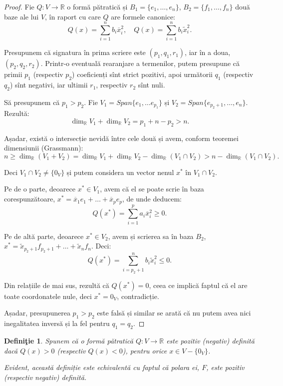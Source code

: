 \documentclass[11pt,a4paper]{article}
\theoremstyle{dotless}
\theoremstyle{dotlessdr}
\newtheorem{definition}{Defini\c{t}ie}[section]
\begin{document}
\begin{proof}
	Fie $Q : V \to \mathbb{R}$ o formă pătratică și $B_1 = \{e_1, \dots, e_n\}$,
$B_2 = \{f_1, \dots, f_n\}$ două baze ale lui $V$, în raport cu care $Q$ are
formele canonice: 
 \[
	Q(x) = \sum_{i=1}^n b_i \overline{x}_i^2, \quad 
	Q(x) = \sum_{i=1}^n b_i \widetilde{x}_i^2.
\]

Presupunem că signatura în prima scriere este $(p_1, q_1, r_1)$, iar în a doua,
$(p_2, q_2, r_2)$. Printr-o eventuală rearanjare a termenilor, putem presupune
că primii $p_1$ (respectiv $p_2$) coeficienți sînt strict pozitivi, apoi
următorii $q_1$ (respectiv $q_2$) sînt negativi, iar ultimii $r_1$, respectiv
$r_2$ sînt nuli.

Să presupunem că $p_1 > p_2$. Fie $V_1 = Span \{e_1, \dots e_{p_1}\}$ și
$V_2 = Span \{e_{p_2 + 1}, \dots, e_n\}$. Rezultă: 
 \[
	\dim_{\mathbb{R}} V_1 + \dim_{\mathbb{R}} V_2 = p_1 + n - p_2 > n.
\]

Așadar, există o intersecție nevidă între cele două și avem, conform teoremei
dimensiunii (Grassmann): 
 \[
	n \geq \dim_{\mathbb{R}}(V_1 + V_2) = \dim_{\mathbb{R}} V_1 + 
	\dim_{\mathbb{R}} V_2 - \dim_{\mathbb{R}} (V_1 \cap V_2) > 
	n - \dim_{\mathbb{R}} (V_1 \cap V_2).
\]

Deci $V_1 \cap V_2 \neq \{0_V\}$ și putem considera un vector nenul $x^\ast$ în
$V_1 \cap V_2$.

Pe de o parte, deoarece $x^\ast \in V_1$, avem că el se poate scrie în baza
corespunzătoare, $x^\ast = \overline{x}_1 e_1 + \dots + \overline{x}_p e_p$,
de unde deducem: 
 \[
	Q(x^\ast) = \sum_{i=1}^p a_i \overline{x}_i^2 \geq 0.
\]

Pe de altă parte, deoarece $x^\ast \in V_2$, avem și scrierea sa în baza
$B_2$, $x^\ast = \widetilde{x}_{p_2 + 1} f_{p_2 + 1} + \dots + 
                 \widetilde{x}_n f_n$. Deci: 
 \[
	Q(x^\ast) = \sum_{i = p_2 + 1}^n b_i \widetilde{x}_i^2 \leq 0.
\]

Din relațiile de mai sus, rezultă că $Q(x^\ast) = 0$, ceea ce implică faptul
că el are toate coordonatele nule, deci $x^\ast = 0_V$, contradicție.

Așadar, presupunerea $p_1 > p_2$ este falsă și similar se arată că nu putem avea
nici inegalitatea inversă și la fel pentru $q_1 = q_2$.
\end{proof}

\begin{definition}
	Spunem că o formă pătratică $Q : V \to \mathbb{R}$ este \emph{pozitiv 
(negativ) definită} dacă $Q(x) > 0$ (respectiv $Q(x) < 0$), pentru orice
$x \in V - \{0_V\}$. 

Evident, această definiție este echivalentă cu faptul că polara ei, $F$,
este pozitiv (respectiv negativ) definită.
\end{definition}
\end{document}
